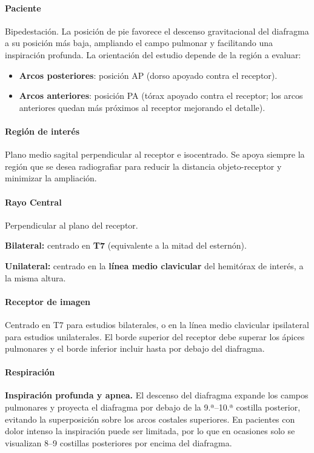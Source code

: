 	\paragraph{Paciente}
	Bipedestación. La posición de pie favorece el descenso gravitacional del diafragma a su posición más baja, ampliando el campo pulmonar y facilitando una inspiración profunda. La orientación del estudio depende de la región a evaluar:
	\begin{itemize}
		\item \textbf{Arcos posteriores}: posición AP (dorso apoyado contra el receptor).
		
		\item \textbf{Arcos anteriores}: posición PA (tórax apoyado contra el receptor; los arcos anteriores quedan más próximos al receptor mejorando el detalle).
	\end{itemize}
	
	\paragraph{Región de interés}
	Plano medio sagital perpendicular al receptor e isocentrado. Se apoya siempre la región que se desea radiografiar para reducir la distancia objeto-receptor y minimizar la ampliación.
	

	
\paragraph{Rayo Central}
Perpendicular al plano del receptor.

\textbf{Bilateral:} centrado en \textbf{T7} (equivalente a la mitad del esternón).

\textbf{Unilateral:} centrado en la \textbf{línea medio clavicular} del hemitórax de interés, a la misma altura.
	
	\paragraph{Receptor de imagen}
	Centrado en T7 para estudios bilaterales, o en la línea medio clavicular ipsilateral para estudios unilaterales. El borde superior del receptor debe superar los ápices pulmonares y el borde inferior incluir hasta por debajo del diafragma.
	
	\paragraph{Respiración}
	\textbf{Inspiración profunda y apnea.} El descenso del diafragma expande los campos pulmonares y proyecta el diafragma por debajo de la 9.ª--10.ª costilla posterior, evitando la superposición sobre los arcos costales superiores. En pacientes con dolor intenso la inspiración puede ser limitada, por lo que en ocasiones solo se visualizan 8--9 costillas posteriores por encima del diafragma.
	
